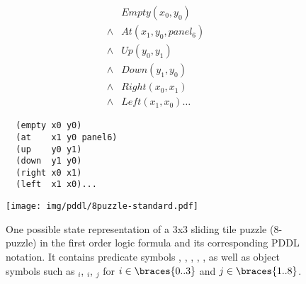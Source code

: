 \begin{figure}[htb]
\centering
\begin{minipage}[c]{0.2\linewidth}
 \begin{align*}
        & Empty(x_0, y_0)          \\
  \land & At   (x_1, y_0, panel_6) \\
  \land & Up   (y_0, y_1)          \\
  \land & Down (y_1, y_0)          \\
  \land & Right(x_0, x_1)          \\
  \land & Left (x_1, x_0)       \ldots 
 \end{align*}
\end{minipage}
\begin{minipage}[c]{0.4\linewidth}
 \begin{lstlisting}
  (empty x0 y0)
  (at    x1 y0 panel6)
  (up    y0 y1)
  (down  y1 y0)
  (right x0 x1)
  (left  x1 x0)...
 \end{lstlisting}
\end{minipage}
\begin{minipage}[c]{0.3\linewidth}
 \texttt{[image: img/pddl/8puzzle-standard.pdf]}
\end{minipage}
\caption{One possible state representation of a
3x3 sliding tile puzzle (8-puzzle) in the first order logic formula and its
corresponding PDDL notation. It contains predicate symbols 
, , , , ,  as well as
object symbols such as $_i$, $_i$, $_j$ for $i \in \braces{0..3}$ and $j\in \braces{1..8}$.
}
\label{8puzzle-pddl}
\end{figure}

